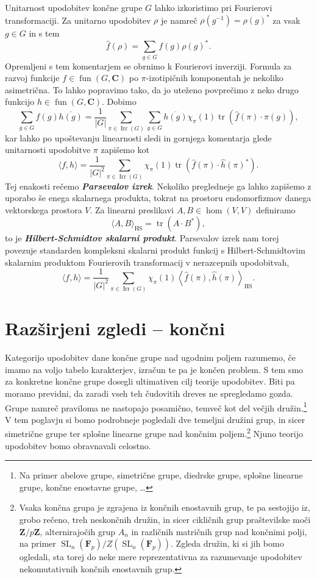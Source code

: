 \documentclass[11pt]{book}
\def\ZZ{\mathbf{Z}}
\def\CC{\mathbf{C}}
\def\FF{\mathbf{F}}
\DeclareMathOperator\tr{tr}
\DeclareMathOperator\Irr{Irr}
\DeclareMathOperator\fun{fun}
\DeclareMathOperator\HS{HS}
\DeclareMathOperator\SL{SL}
\def\definicija{\color{rdeca}\bf\em}
\theoremstyle{definition}
\theoremstyle{zgled}
\theoremstyle{odprtproblem}
\theoremstyle{domacanaloga}
\theoremstyle{izrek}
\begin{document}
Unitarnost upodobitev končne grupe $G$ lahko izkoristimo pri Fourierovi transformaciji. Za unitarno upodobitev $\rho$ je namreč $\rho(g^{-1}) = \rho(g)^*$ za vsak $g \in G$ in s tem
\[
    \hat{f}(\rho) = \sum_{g \in G} f(g) \rho(g)^*.
\]
Opremljeni s tem komentarjem se obrnimo k Fourierovi inverziji. Formula za razvoj funkcije $f \in \fun(G,\CC)$ po $\pi$-izotipičnih komponentah je nekoliko asimetrična. To lahko popravimo tako, da jo uteženo povprečimo z neko drugo funkcijo $h \in \fun(G,\CC)$. Dobimo
\[
    \sum_{g \in G} f(g) \overline{h(g)} = \frac{1}{|G|} \sum_{\pi \in \Irr(G)} \sum_{g \in G} \overline{h(g)} \chi_{\pi}(1) \tr \left( \hat{f}(\pi) \cdot \pi(g) \right),
\]
kar lahko po upoštevanju linearnosti sledi in gornjega komentarja glede unitarnosti upodobitve $\pi$ zapišemo kot
\[
    \langle f, h \rangle = \frac{1}{|G|^2} \sum_{\pi \in \Irr(G)} \chi_{\pi}(1) \tr(\hat{f}(\pi) \cdot \hat{h}(\pi)^*).
\]
Tej enakosti rečemo {\definicija Parsevalov izrek}. Nekoliko pregledneje ga lahko zapišemo z uporabo še enega skalarnega produkta, tokrat na prostoru endomorfizmov danega vektorskega prostora $V$. Za linearni preslikavi $A,B \in \hom(V,V)$ definiramo
\[
    \langle A, B \rangle_{\HS} = \tr(A \cdot B^*),
\]
to je {\definicija Hilbert-Schmidtov skalarni produkt}. Parsevalov izrek nam torej povezuje standarden kompleksni skalarni produkt funkcij s Hilbert-Schmidtovim skalarnim produktom Fourierovih transformacij v nerazcepnih upodobitvah,
\[
    \langle f, h \rangle = \frac{1}{|G|^2} \sum_{\pi \in \Irr(G)} \chi_{\pi}(1) \left\langle \hat{f}(\pi), \hat{h}(\pi) \right\rangle_{\HS}.
\]

\chapter{Razširjeni zgledi -- končni}

Kategorijo upodobitev dane končne grupe nad ugodnim poljem razumemo, če imamo na voljo tabelo karakterjev, izračun te pa je končen problem. S tem smo za konkretne končne grupe dosegli ultimativen cilj teorije upodobitev. Biti pa moramo previdni, da zaradi vseh teh čudovitih dreves ne spregledamo gozda. Grupe namreč praviloma ne nastopajo posamično, temveč kot del večjih družin.\footnote{Na primer abelove grupe, simetrične grupe, diedrske grupe, splošne linearne grupe, končne enostavne grupe, \dots} V tem poglavju si bomo podrobneje pogledali dve temeljni družini grup, in sicer simetrične grupe ter splošne linearne grupe nad končnim poljem.\footnote{Vsaka končna grupa je zgrajena iz končnih enostavnih grup, te pa sestojijo iz, grobo rečeno, treh neskončnih družin, in sicer cikličnih grup praštevilske moči $\ZZ/p\ZZ$, alternirajočih grup $A_n$ in različnih matričnih grup nad končnimi polji, na primer $\SL_n(\FF_p)/Z(\SL_n(\FF_p))$. Zgleda družin, ki si jih bomo ogledali, sta torej do neke mere reprezentativna za razumevanje upodobitev nekomutativnih končnih enostavnih grup.} Njuno teorijo upodobitev bomo obravnavali celostno.
\end{document}
